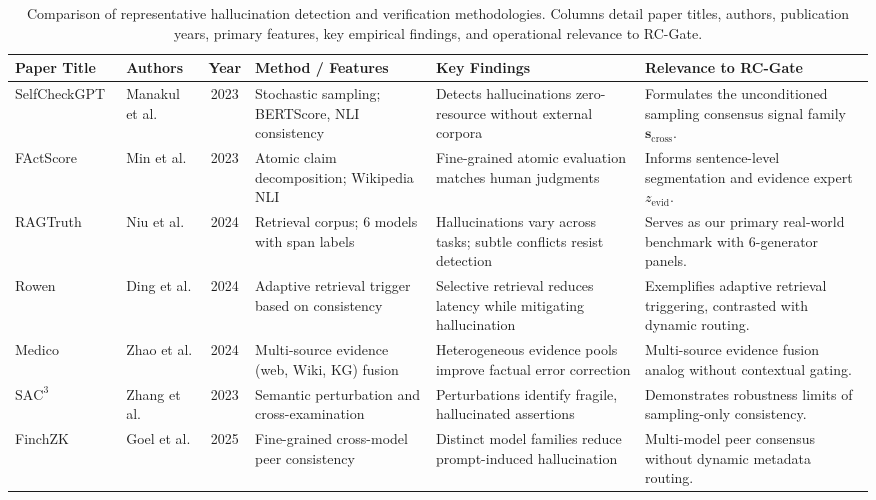 \documentclass[pdflatex,sn-mathphys,Numbered]{sn-jnl}
\begin{document}
\begin{table}[htbp]
\caption{Comparison of representative hallucination detection and verification methodologies. Columns detail paper titles, authors, publication years, primary features, key empirical findings, and operational relevance to RC-Gate.}\label{tab:related_work}
\scriptsize
\setlength{\tabcolsep}{3pt}
\begin{tabular}{@{}p{2.3cm}p{1.6cm}cp{2.2cm}p{2.7cm}p{2.8cm}@{}}
\toprule
\textbf{Paper Title} & \textbf{Authors} & \textbf{Year} & \textbf{Method / Features} & \textbf{Key Findings} & \textbf{Relevance to RC-Gate} \\
\midrule
SelfCheckGPT~\cite{manakul2023selfcheckgpt} & Manakul et al. & 2023 & Stochastic sampling; BERTScore, NLI consistency & Detects hallucinations zero-resource without external corpora & Formulates the unconditioned sampling consensus signal family $\mathbf{s}_{\mathrm{cross}}$. \\
\addlinespace
FActScore~\cite{min2023factscore} & Min et al. & 2023 & Atomic claim decomposition; Wikipedia NLI & Fine-grained atomic evaluation matches human judgments & Informs sentence-level segmentation and evidence expert $z_{\mathrm{evid}}$. \\
\addlinespace
RAGTruth~\cite{niu2024ragtruth} & Niu et al. & 2024 & Retrieval corpus; 6 models with span labels & Hallucinations vary across tasks; subtle conflicts resist detection & Serves as our primary real-world benchmark with 6-generator panels. \\
\addlinespace
Rowen~\cite{ding2024rowen} & Ding et al. & 2024 & Adaptive retrieval trigger based on consistency & Selective retrieval reduces latency while mitigating hallucination & Exemplifies adaptive retrieval triggering, contrasted with dynamic routing. \\
\addlinespace
Medico~\cite{zhao2024medico} & Zhao et al. & 2024 & Multi-source evidence (web, Wiki, KG) fusion & Heterogeneous evidence pools improve factual error correction & Multi-source evidence fusion analog without contextual gating. \\
\addlinespace
$\mathrm{SAC}^3$~\cite{zhang2023sac3} & Zhang et al. & 2023 & Semantic perturbation and cross-examination & Perturbations identify fragile, hallucinated assertions & Demonstrates robustness limits of sampling-only consistency. \\
\addlinespace
FinchZK~\cite{goel2025finchzk} & Goel et al. & 2025 & Fine-grained cross-model peer consistency & Distinct model families reduce prompt-induced hallucination & Multi-model peer consensus without dynamic metadata routing. \\

\end{tabular}
\end{table}
\end{document}
